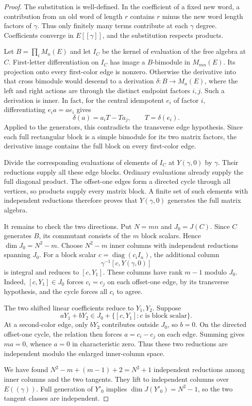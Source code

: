 \documentclass[11pt]{article}
\theoremstyle{definition}
\theoremstyle{remark}
\numberwithin{equation}{section}
\begin{document}
\begin{proof}
The substitution is well-defined.  In the coefficient of a fixed
new word, a contribution from an old word of length $r$ contains
$r$ minus the new word length factors of $\gamma$.  Thus only
finitely many terms contribute at each $\gamma$ degree.  Coefficients
converge in $E[[\gamma]]$, and the substitution respects products.

Let $B=\prod_iM_n(E)$ and let $I_C$ be the kernel of evaluation of
the free algebra at $C$.  First-letter differentiation on $I_C$
has image a $B$-bimodule in $M_{mn}(E)$.  Its projection onto every
first-color edge is nonzero.  Otherwise the derivative into that
cross bimodule would descend to a derivation $\delta:B\to M_n(E)$,
where the left and right actions are through the distinct endpoint
factors $i,j$.  Such a derivation is inner.  In fact, for the central
idempotent $e_i$ of factor $i$, differentiating $e_i a=a e_i$ gives
\[
 \delta(a)=a_iT-Ta_j,\qquad T=\delta(e_i).
\]
Applied to the generators, this contradicts the transverse edge
hypothesis.  Since each full rectangular block is a simple bimodule
for its two matrix factors, the derivative image contains the full
block on every first-color edge.

Divide the corresponding evaluations of elements of $I_C$ at
$Y(\gamma,0)$ by $\gamma$.  Their reductions supply all these edge
blocks.  Ordinary evaluations already supply the full diagonal
product.  The offset-one edges form a directed cycle through all
vertices, so products supply every matrix block.  A finite set of
such elements with independent reductions therefore proves that
$Y(\gamma,0)$ generates the full matrix algebra.

It remains to check the two directions.  Put $N=mn$ and
$J_0=J(C)$.  Since $C$ generates $B$, its commutant consists of the
$m$ block scalars.  Hence $\dim J_0=N^2-m$.  Choose $N^2-m$ inner
columns with independent reductions spanning $J_0$.  For a block
scalar $c=\operatorname{diag}(c_i I_n)$, the additional column
\[
 \gamma^{-1}[c,Y(\gamma,0)]
\]
is integral and reduces to $[c,Y_1]$.  These columns have rank
$m-1$ modulo $J_0$.  Indeed, $[c,Y_1]\in J_0$ forces $c_i=c_j$
on each offset-one edge, by its transverse hypothesis, and the
cycle forces all $c_i$ to agree.

The two shifted linear coefficients reduce to $Y_1,Y_2$.  Suppose
\[
 aY_1+bY_2\in J_0+\{[c,Y_1]:c\text{ is block scalar}\}.
\]
At a second-color edge, only $bY_2$ contributes outside $J_0$,
so $b=0$.  On the directed offset-one cycle, the relation then
forces $a=c_i-c_j$ on each edge.  Summing gives $ma=0$, whence
$a=0$ in characteristic zero.  Thus these two reductions are
independent modulo the enlarged inner-column space.

We have found $N^2-m+(m-1)+2=N^2+1$ independent reductions among
inner columns and the two tangents.  They lift to independent
columns over $E((\gamma))$.  Full generation of $Y'_0$ implies
$\dim J(Y'_0)=N^2-1$, so the two tangent classes are independent.
\end{proof}
\end{document}
